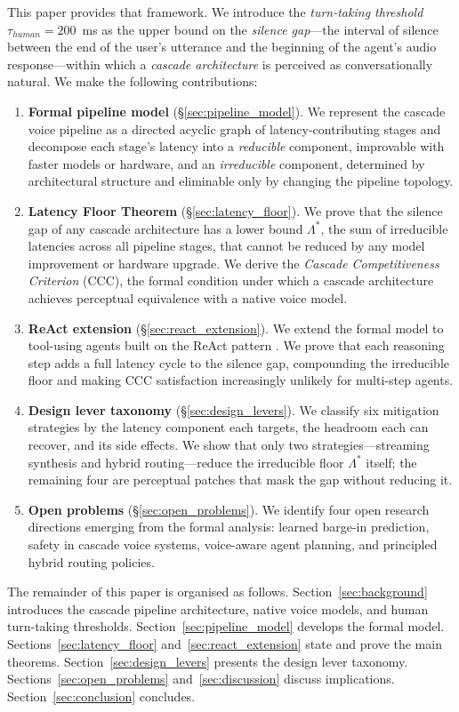 This paper provides that framework.
We introduce the \emph{turn-taking threshold} $\tau_{human} = 200$~ms as the upper bound on
the \emph{silence gap}---the interval of silence between the end of the user's utterance and
the beginning of the agent's audio response---within which a \emph{cascade architecture} is
perceived as conversationally natural.
We make the following contributions:

\begin{enumerate}
\item \textbf{Formal pipeline model} (\S\ref{sec:pipeline_model}).
We represent the cascade voice pipeline as a directed acyclic graph of latency-contributing
stages and decompose each stage's latency into a \emph{reducible} component,
improvable with faster models or hardware, and an \emph{irreducible} component,
determined by architectural structure and eliminable only by changing the pipeline topology.

\item \textbf{Latency Floor Theorem} (\S\ref{sec:latency_floor}).
We prove that the silence gap of any cascade architecture has a lower bound $\Lambda^*$,
the sum of irreducible latencies across all pipeline stages,
that cannot be reduced by any model improvement or hardware upgrade.
We derive the \emph{Cascade Competitiveness Criterion} (CCC),
the formal condition under which a cascade architecture achieves perceptual equivalence
with a native voice model.

\item \textbf{ReAct extension} (\S\ref{sec:react_extension}).
We extend the formal model to tool-using agents built on the ReAct pattern \citep{yao2023react}.
We prove that each reasoning step adds a full latency cycle to the silence gap,
compounding the irreducible floor and making CCC satisfaction increasingly unlikely
for multi-step agents.

\item \textbf{Design lever taxonomy} (\S\ref{sec:design_levers}).
We classify six mitigation strategies by the latency component each targets,
the headroom each can recover, and its side effects.
We show that only two strategies---streaming synthesis and hybrid routing---reduce
the irreducible floor $\Lambda^*$ itself;
the remaining four are perceptual patches that mask the gap without reducing it.

\item \textbf{Open problems} (\S\ref{sec:open_problems}).
We identify four open research directions emerging from the formal analysis:
learned barge-in prediction, safety in cascade voice systems,
voice-aware agent planning, and principled hybrid routing policies.
\end{enumerate}

The remainder of this paper is organised as follows.
Section~\ref{sec:background} introduces the cascade pipeline architecture,
native voice models, and human turn-taking thresholds.
Section~\ref{sec:pipeline_model} develops the formal model.
Sections~\ref{sec:latency_floor} and~\ref{sec:react_extension} state and prove the main theorems.
Section~\ref{sec:design_levers} presents the design lever taxonomy.
Sections~\ref{sec:open_problems} and~\ref{sec:discussion} discuss implications.
Section~\ref{sec:conclusion} concludes.

